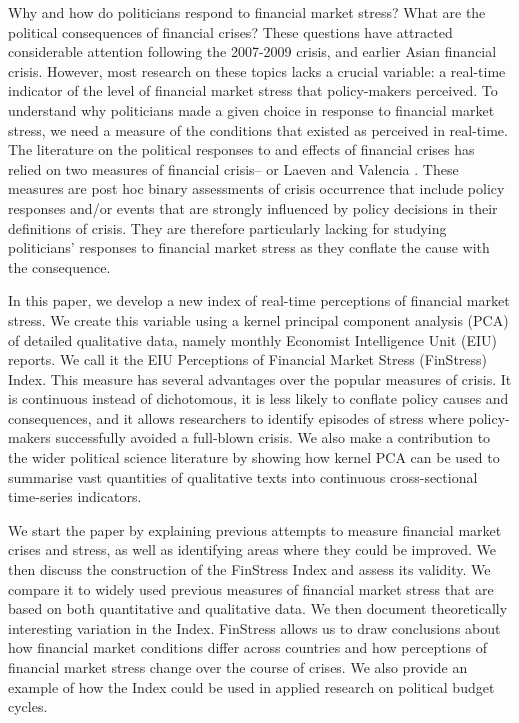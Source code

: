 \documentclass[]{article}
\begin{document}
Why and how do politicians respond to financial market stress? What are the political consequences of financial crises? These questions have attracted considerable attention following the 2007-2009 crisis, and earlier Asian financial crisis. However, most research on these topics lacks a crucial variable: a real-time indicator of the level of financial market stress that policy-makers perceived. To understand why politicians made a given choice in response to financial market stress, we need a measure of the conditions that existed as perceived in real-time. The literature on the political responses to and effects of financial crises has relied on two measures of financial crisis--\cite{Reinhart2009,ReinhartRog2010} or Laeven and Valencia \citeyearpar[and their predecessors]{laeven2013}. These measures are post hoc binary assessments of crisis occurrence that include policy responses and/or events that are strongly influenced by policy decisions in their definitions of crisis. They are therefore particularly lacking for studying politicians' responses to financial market stress as they conflate the cause with the consequence.

In this paper, we develop a new index of real-time perceptions of financial market stress. We create this variable using a kernel principal component analysis (PCA) of detailed qualitative data, namely monthly Economist Intelligence Unit (EIU) reports. We call it the EIU Perceptions of Financial Market Stress (FinStress) Index. This measure has several advantages over the popular measures of crisis. It is continuous instead of dichotomous, it is less likely to conflate policy causes and consequences, and it allows researchers to identify episodes of stress where policy-makers successfully avoided a full-blown crisis. We also make a contribution to the wider political science literature by showing how kernel PCA can be used to summarise vast quantities of qualitative texts into continuous cross-sectional time-series indicators.

We start the paper by explaining previous attempts to measure financial market crises and stress, as well as identifying areas where they could be improved. We then discuss the construction of the FinStress Index and assess its validity. We compare it to widely used previous measures of financial market stress that are based on both quantitative and qualitative data. We then document theoretically interesting variation in the Index. FinStress allows us to draw conclusions about how financial market conditions differ across countries and how perceptions of financial market stress change over the course of crises. We also provide an example of how the Index could be used in applied research on political budget cycles.
\end{document}
